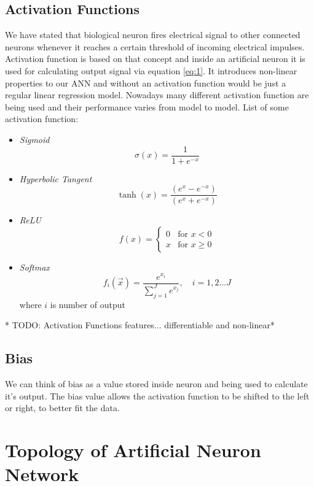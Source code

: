 \subsection{Activation Functions}

We have stated that biological neuron fires electrical signal to other connected neurons whenever it reaches a certain threshold of incoming electrical impulses.
Activation function is based on that concept and inside an artificial neuron it is used for calculating output signal via equation \ref{eq:1}.
It introduces non-linear properties to our ANN and without an activation function would be just a regular linear regression model.
Nowadays many different activation function are being used and their performance varies from model to model. \newline
\newline
List of some activation function:

\begin{itemize}
	\item \textit{Sigmoid} \[ \sigma(x)=\frac{1}{1+e^{-x}} \]
	\item \textit{Hyperbolic Tangent} \[ \tanh(x)=\frac{(e^{x} - e^{-x})}{(e^{x} + e^{-x})} \]
  \item \textit{ReLU}  \[ f(x) = \begin{cases} 0 & \text{for } x < 0 \\ x & \text{for } x \ge 0\end{cases} \]
  \item \textit{Softmax} \[ f_i(\vec{x}) = \frac{e^{x_i}}{\sum_{j=1}^J e^{x_j}}, \quad i = 1, 2 \ldots J \]
    where $i$ is number of output
\end{itemize}

* TODO: Activation Functions features... differentiable and non-linear*

\subsection{Bias}

We can think of bias as a value stored inside neuron and being used to calculate it's output.
The bias value allows the activation function to be shifted to the left or right, to better fit the data.


\section{Topology of Artificial Neuron Network}

